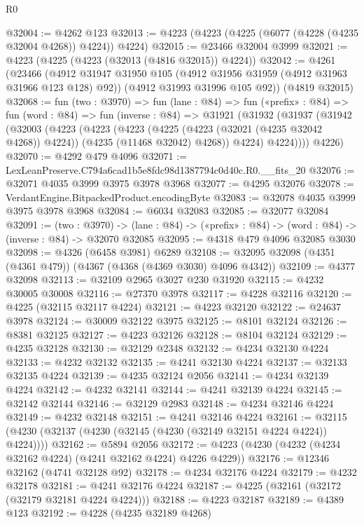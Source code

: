 \begin{lexlean}{R0}
\begin{coremodule}
@32004 := @4262 @123
@32013 := @4223 (@4223 (@4225 (@6077 (@4228 (@4235 @32004 @4268)) @4224)) @4224)
@32015 := @23466 @32004 @3999
@32021 := @4223 (@4225 (@4223 (@32013 (@4816 @32015)) @4224))
@32042 := @4261
    (@23466
      (@4912 @31947 @31950 @105 (@4912 @31956 @31959 (@4912 @31963 @31966 @123 @128) @92))
      (@4912 @31993 @31996 @105 @92))
    (@4819 @32015)
@32068 := fun (two : @3970) =>
  fun (lane : @84) =>
  fun («prefix» : @84) =>
  fun (word : @84) =>
  fun (inverse : @84) =>
  @31921
    (@31932
      (@31937
        (@31942
          (@32003
            (@4223
              (@4223
                (@4223
                  (@4225 (@4223 (@32021 (@4235 @32042 @4268)) @4224))
                  (@4235 (@11468 @32042) @4268))
                @4224)
              @4224))))
      @4226)
@32070 := @4292 @479 @4096
@32071 := LexLeanPreserve.C794a6cad1b5e8fdc98d1387794c0d40c.R0.__fits_20
@32076 := @32071 @4035 @3999 @3975 @3978 @3968
@32077 := @4295 @32076
@32078 := VerdantEngine.BitpackedProduct.encodingByte
@32083 := @32078 @4035 @3999 @3975 @3978 @3968
@32084 := @6034 @32083
@32085 := @32077 @32084
@32091 := (two : @3970) ->
  (lane : @84) -> («prefix» : @84) -> (word : @84) -> (inverse : @84) -> @32070 @32085
@32095 := @4318 @479 @4096 @32085 @3030
@32098 := @4326 (@6458 @3981) @6289
@32108 := @32095 @32098 (@4351 (@4361 @479)) (@4367 (@4368 (@4369 @3030) @4096 @4342))
@32109 := @4377 @32098
@32113 := @32109 @2965 @3027 @230 @31920
@32115 := @4232 @30005 @30008
@32116 := @27370 @3978
@32117 := @4228 @32116
@32120 := @4225 (@32115 @32117 @4224)
@32121 := @4223 @32120
@32122 := @24637 @3978
@32124 := @30009 @32122 @3975
@32125 := @8101 @32124
@32126 := @8381 @32125
@32127 := @4223 @32126
@32128 := @8104 @32124
@32129 := @4235 @32128
@32130 := @32129 @2348
@32132 := @4234 @32130 @4224
@32133 := @4232 @32132
@32135 := @4241 @32130 @4224
@32137 := @32133 @32135 @4224
@32139 := @4235 @32124 @2056
@32141 := @4234 @32139 @4224
@32142 := @4232 @32141
@32144 := @4241 @32139 @4224
@32145 := @32142 @32144
@32146 := @32129 @2983
@32148 := @4234 @32146 @4224
@32149 := @4232 @32148
@32151 := @4241 @32146 @4224
@32161 := @32115 (@4230 (@32137 (@4230 (@32145 (@4230 (@32149 @32151 @4224 @4224)) @4224))))
@32162 := @5894 @2056
@32172 := @4223 (@4230 (@4232 (@4234 @32162 @4224) (@4241 @32162 @4224) @4226 @4229))
@32176 := @12346 @32162 (@4741 @32128 @92)
@32178 := @4234 @32176 @4224
@32179 := @4232 @32178
@32181 := @4241 @32176 @4224
@32187 := @4225 (@32161 (@32172 (@32179 @32181 @4224 @4224)))
@32188 := @4223 @32187
@32189 := @4389 @123
@32192 := @4228 (@4235 @32189 @4268)

\end{coremodule}
\end{lexlean}
